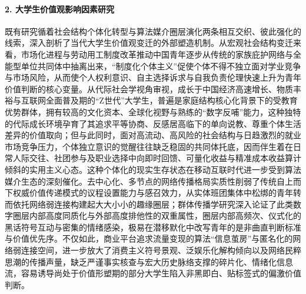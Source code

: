 \paragraph{2. 大学生价值观影响因素研究}
既有研究循着社会结构个体化转型与算法媒介圈层演化两条相互交织、彼此强化的线索，深入剖析了当代大学生价值观变迁的外部塑造机制。从宏观社会结构变迁来看，市场化进程与劳动用工制度改革推动中国青年逐步从传统的家族庇护网络与全能型单位共同体中抽离出来，“制度化个体主义”促使个体不得不独立面对学业竞争与市场风险，从而使个人权利意识、自主选择诉求与自我负责伦理快速上升为青年价值判断的核心变量\cite{Yan2012}。从代际社会学视角审视，成长于中国经济高速增长、物质丰裕与互联网全面普及期的“Z世代”大学生，普遍是家庭结构核心化背景下的受教育优势群体，拥有较高的文化资本、全球化视野与熟练的“数字反哺”能力，这种独特的代际成长环境孕育了其追求平等协商、反感居高临下的单向说教、尊重个体生活差异的价值取向\cite{Zhou2020,Li2021}；但与此同时，面对高流动、高风险的社会结构与日趋激烈的就业市场竞争压力，个体独立意识的觉醒往往缺乏稳固的共同体托底，因而伴生着在日常人际交往、社团参与及职业选择中向即时回馈、可量化收益与精准成本收益算计倾斜的实用主义心态\cite{Lu2022}。这种个体化的现实生存状态在移动互联时代进一步受到算法媒介生态的深刻催化。去中心化、多节点的网络传播格局实质性削弱了传统自上而下权威价值传递模式的议程设置能力与感召效力\cite{Hu2017}，从实体班团集体中松绑的青年转而依托网络弱连接构建起大大小小的趣缘圈层；群体传播学研究深入论证了此类数字圈层内部高度同质化与外部高度排他性的双重属性，圈层内部高频次、仪式化的黑话符号互动与密集的情绪感染，极易在潜移默化中改写青年的是非曲直判断标准与价值优先序\cite{Sui2021}。不仅如此，商业平台追求流量变现的算法“信息茧房”与匿名化的网络弱连接空间，进一步放大了消费主义符号景观、泛娱乐化解构倾向以及网络民粹思潮的传播声量，缺乏严谨事实核查与宏大历史脉络支撑的碎片化、情绪化信息流，容易诱导尚处于价值形塑期的部分大学生陷入非黑即白、贴标签式的偏激价值判断\cite{Zhu2021,Cui2023}。

